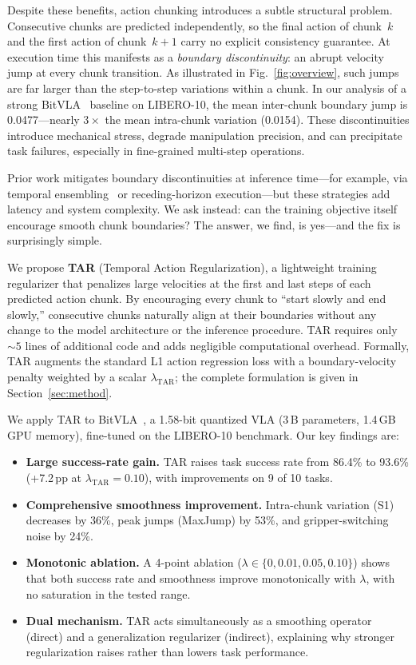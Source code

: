 Despite these benefits, action chunking introduces a subtle structural problem. Consecutive chunks are predicted independently, so the final action of chunk~$k$ and the first action of chunk~$k{+}1$ carry no explicit consistency guarantee. At execution time this manifests as a \emph{boundary discontinuity}: an abrupt velocity jump at every chunk transition. As illustrated in Fig.~\ref{fig:overview}, such jumps are far larger than the step-to-step variations within a chunk. In our analysis of a strong BitVLA~\cite{wang2025bitvla} baseline on LIBERO-10, the mean inter-chunk boundary jump is 0.0477---nearly $3\times$ the mean intra-chunk variation (0.0154). These discontinuities introduce mechanical stress, degrade manipulation precision, and can precipitate task failures, especially in fine-grained multi-step operations.

Prior work mitigates boundary discontinuities at inference time---for example, via temporal ensembling~\cite{zhao2023act} or receding-horizon execution---but these strategies add latency and system complexity. We ask instead: can the training objective itself encourage smooth chunk boundaries? The answer, we find, is yes---and the fix is surprisingly simple.

We propose \textbf{TAR} (Temporal Action Regularization), a lightweight training regularizer that penalizes large velocities at the first and last steps of each predicted action chunk. By encouraging every chunk to ``start slowly and end slowly,'' consecutive chunks naturally align at their boundaries without any change to the model architecture or the inference procedure. TAR requires only ${\sim}5$ lines of additional code and adds negligible computational overhead. Formally, TAR augments the standard L1 action regression loss with a boundary-velocity penalty weighted by a scalar $\lambda_{\text{TAR}}$; the complete formulation is given in Section~\ref{sec:method}.

We apply TAR to BitVLA~\cite{wang2025bitvla}, a 1.58-bit quantized VLA (3\,B parameters, 1.4\,GB GPU memory), fine-tuned on the LIBERO-10 benchmark. Our key findings are:
\begin{itemize}
    \item \textbf{Large success-rate gain.} TAR raises task success rate from 86.4\% to 93.6\% (+7.2\,pp at $\lambda_{\text{TAR}}=0.10$), with improvements on 9 of 10 tasks.
    \item \textbf{Comprehensive smoothness improvement.} Intra-chunk variation (S1) decreases by 36\%, peak jumps (MaxJump) by 53\%, and gripper-switching noise by 24\%.
    \item \textbf{Monotonic ablation.} A 4-point ablation ($\lambda \in \{0, 0.01, 0.05, 0.10\}$) shows that both success rate and smoothness improve monotonically with $\lambda$, with no saturation in the tested range.
    \item \textbf{Dual mechanism.} TAR acts simultaneously as a smoothing operator (direct) and a generalization regularizer (indirect), explaining why stronger regularization raises rather than lowers task performance.
\end{itemize}
